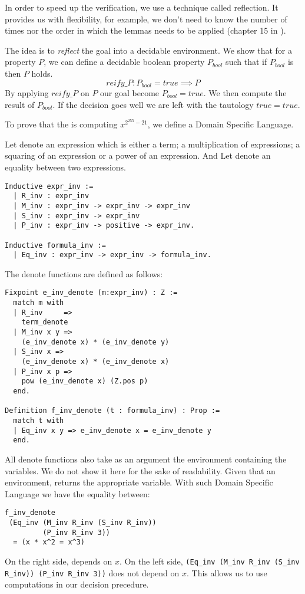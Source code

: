 In order to speed up the verification, we use a technique called reflection.
It provides us with flexibility, for example, we don't need to know the number of
times nor the order in which the lemmas needs to be applied (chapter 15 in \cite{CpdtJFR}).

The idea is to \textit{reflect} the goal into a decidable environment.
We show that for a property $P$, we can define a decidable boolean property
$P_{bool}$ such that if $P_{bool}$ is  then $P$ holds.
$$reify\_P : P_{bool} = true \implies P$$
By applying $reify\_P$ on $P$ our goal become $P_{bool} = true$.
We then compute the result of $P_{bool}$. If the decision goes well we are
left with the tautology $true = true$.

To prove that the  is computing $x^{2^{255}-21}$,
we define a Domain Specific Language.
\begin{definition}
Let  denote an expression which is either a term;
a multiplication of expressions; a squaring of an expression or a power of an expression.
And Let  denote an equality between two expressions.
\end{definition}
\begin{lstlisting}[language=Coq]
Inductive expr_inv :=
  | R_inv : expr_inv
  | M_inv : expr_inv -> expr_inv -> expr_inv
  | S_inv : expr_inv -> expr_inv
  | P_inv : expr_inv -> positive -> expr_inv.

Inductive formula_inv :=
  | Eq_inv : expr_inv -> expr_inv -> formula_inv.
\end{lstlisting}
The denote functions are defined as follows:
\begin{lstlisting}[language=Coq]
Fixpoint e_inv_denote (m:expr_inv) : Z :=
  match m with
  | R_inv     =>
    term_denote
  | M_inv x y =>
    (e_inv_denote x) * (e_inv_denote y)
  | S_inv x =>
    (e_inv_denote x) * (e_inv_denote x)
  | P_inv x p =>
    pow (e_inv_denote x) (Z.pos p)
  end.

Definition f_inv_denote (t : formula_inv) : Prop :=
  match t with
  | Eq_inv x y => e_inv_denote x = e_inv_denote y
  end.
\end{lstlisting}
All denote functions also take as an argument the environment containing the variables.
We do not show it here for the sake of readability.
Given that an environment,  returns the appropriate variable.
With such Domain Specific Language we have the equality between:
\begin{lstlisting}[backgroundcolor=\color{white}]
f_inv_denote
 (Eq_inv (M_inv R_inv (S_inv R_inv))
         (P_inv R_inv 3))
  = (x * x^2 = x^3)
\end{lstlisting}
On the right side,  depends on $x$. On the left side,
\texttt{(Eq\_inv (M\_inv R\_inv (S\_inv R\_inv)) (P\_inv R\_inv 3))} does not depend on $x$.
This allows us to use computations in our decision precedure.

